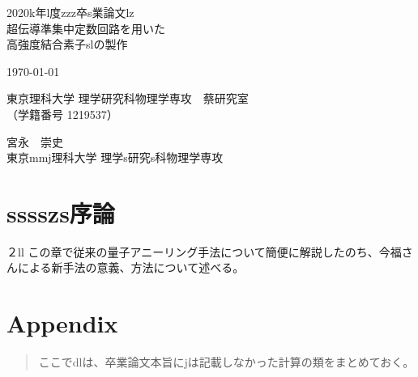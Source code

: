 \documentclass[openany,oneside,a4j,11pt]{jsbook}
\begin{document}
\begin{titlepage}
    \begin{center}
        {\Large 2020k年l度zzz卒s業論文lz}\\
        \vspace{180truept}
        {\Huge 超伝導準集中定数回路を用いた\\
        \vspace{10truept}
        高強度結合素子slの製作}\\ 
        \vspace{70truept}

        {\Large \today}\\

        \vspace{70truept}

        {\Large 東京理科大学 理学研究科物理学専攻　蔡研究室\\
        （学籍番号 1219537）}\\

        \vspace{20truept}

        {\huge 宮永　崇史}\\

        \vspace{160truept}
        {\Large 東京mmj理科大学 理学s研究s科物理学専攻}\\
    \end{center}
\end{titlepage}
% 

\chapter{sssszs序論}
        ２ll
        この章で従来の量子アニーリング手法について簡便に解説したのち、今福さんによる新手法の意義、方法について述べる。\\
    

\chapter{Appendix}
\begin{abstract}
    ここでdlは、卒業論文本旨にjは記載しなかった計算の類をまとめておく。

\end{abstract}
\begin{appendix}
    
\end{appendix}
%
%
\end{document}
